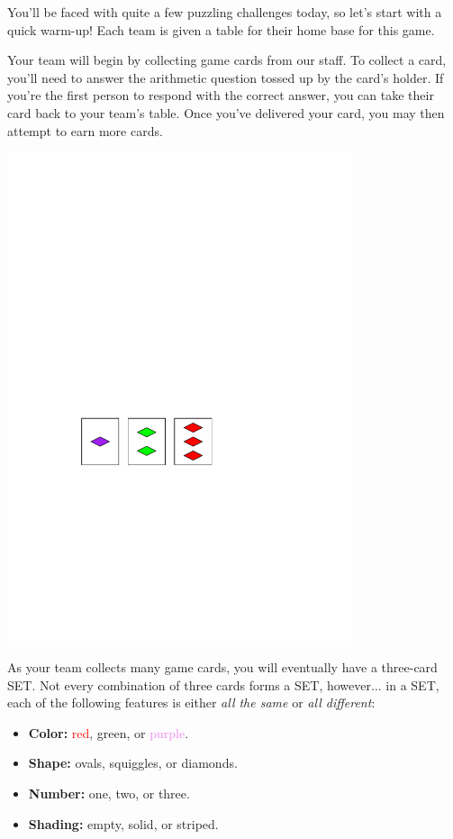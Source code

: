 


  You'll be faced with quite a few puzzling challenges today, so let's
  start with a quick warm-up! Each team is given a table for their home
  base for this game.

  Your team will begin by collecting game cards from our staff.
  To collect a card, you'll need to answer the arithmetic question
  tossed up by the card's holder. If you're the first person to
  respond with the correct answer, you can take their card back to your
  team's table. Once you've delivered your card, you may then
  attempt to earn more cards.

  \begin{center}
    \includegraphics[width=4in]{assets/steven/set-cards.pdf}
  \end{center}

  As your team collects many game cards, you will eventually have
  a three-card SET. Not every combination of three cards forms a SET,
  however... in a SET, each of the following features is either
  \textit{all the same} or \textit{all different}:

  \begin{itemize}
    \item \textbf{Color:}
      \textcolor{red}{red},
      \textcolor{green!60!black}{green}, or
      \textcolor{violet}{purple}.
    \item \textbf{Shape:}
      ovals,
      squiggles, or
      diamonds.
    \item \textbf{Number:}
      one,
      two, or
      three.
    \item \textbf{Shading:}
      empty,
      solid, or
      striped.
  \end{itemize}


